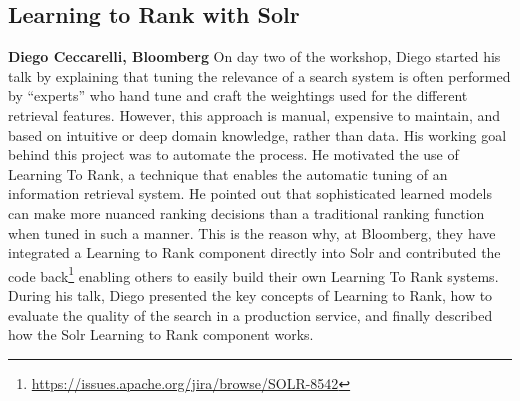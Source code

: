 
\subsection*{Learning to Rank with Solr}
{\bf Diego Ceccarelli, Bloomberg}
On day two of the workshop, Diego started his talk by explaining that tuning
the relevance of a search system is often performed by ``experts'' who hand tune and craft
the weightings used for the different retrieval features.
However, this approach is manual, expensive to maintain, and based on intuitive or deep domain knowledge,
 rather than data. His working goal behind this project was to automate the process.
 He motivated the use of Learning To Rank, a technique that enables
 the automatic tuning of an information retrieval system.  He pointed out that sophisticated learned models can make
 more nuanced ranking decisions than a traditional ranking function when tuned
 in such a manner. This is the reason why, at Bloomberg, they have integrated a Learning to Rank
 component directly into Solr and contributed the code back\footnote{\url{https://issues.apache.org/jira/browse/SOLR-8542}}
 enabling others to easily build their own Learning To Rank systems.
During his talk, Diego presented the key concepts of
 Learning to Rank, how to evaluate the quality of the search in a production service,
 and finally described how the Solr Learning to Rank component works.

